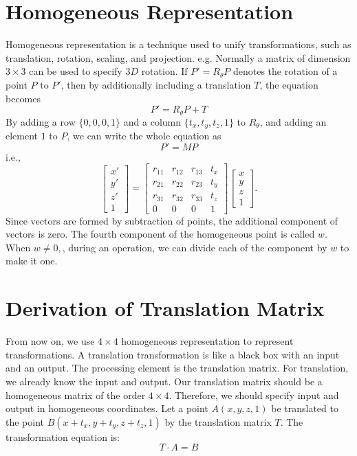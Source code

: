\section{Homogeneous Representation}
Homogeneous representation is a technique used to unify transformations, such as translation, rotation, scaling, and projection.  e.g. Normally a matrix of dimension $3 \times 3$ can be used to specify $3D$ rotation. If $P' = R_{\theta}P$ denotes the rotation of a point $P$ to $P'$, then by additionally including a translation $T$, the equation becomes
\[
P' = R_{\theta}P + T
\]
By adding a row $\{0,0,0,1\}$ and a column $\{t_x,t_y,t_z,1\}$ to $R_{\theta}$, and adding an element $1$ to $P$, we can write the whole equation as
\[
P' = MP
\] 
i.e.,
\[
\begin{bmatrix}
x'\\
y'\\
z'\\
1
\end{bmatrix}
=
\begin{bmatrix}
r_{11} & r_{12} & r_{13} & t_x\\
r_{21} & r_{22} & r_{23} & t_y\\
r_{31} & r_{32} & r_{33} & t_z\\
0 & 0 & 0 & 1
\end{bmatrix}
\begin{bmatrix}
x\\
y\\
z\\
1
\end{bmatrix}.
\]
Since vectors are formed by subtraction of points, the additional component of vectors is zero.  The fourth component of the homogeneous point is called $w$. When $w \neq 0,$, during an operation, we can divide each of the component by $w$ to make  it one. 
\section{Derivation of Translation Matrix}
From now on, we use $4 \times 4$ homogeneous representation to represent transformations.
A translation transformation is like a black box with an input and an output. The processing element is the translation matrix. For translation, we already know the input and output. Our translation matrix should be a homogeneous matrix of the order $4\times4$. Therefore, we should specify input and output in homogeneous coordinates. Let a point \(A(x, y, z, 1)\) be translated to the point \(B(x+t_x, y+t_y, z+t_z, 1)\) by the translation matrix \(T\).
The transformation equation is: \[T \cdot A = B \]

